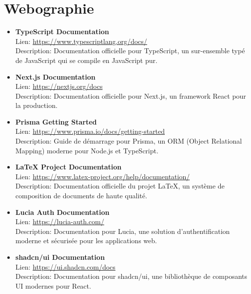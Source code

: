 \documentclass[12pt, french]{extreport}
\begin{document}
\printbibliography
\label{sec:bibliographie}

\chapter*{Webographie}
\label{sec:webographie}
\begin{itemize}
    \item \textbf{TypeScript Documentation} \\
    Lien: \url{https://www.typescriptlang.org/docs/} \\
    Description: Documentation officielle pour TypeScript, un sur-ensemble typé de JavaScript qui se compile en JavaScript pur.

    \item \textbf{Next.js Documentation} \\
    Lien: \url{https://nextjs.org/docs} \\
    Description: Documentation officielle pour Next.js, un framework React pour la production.

    \item \textbf{Prisma Getting Started} \\
    Lien: \url{https://www.prisma.io/docs/getting-started} \\
    Description: Guide de démarrage pour Prisma, un ORM (Object Relational Mapping) moderne pour Node.js et TypeScript.

    \item \textbf{LaTeX Project Documentation} \\
    Lien: \url{https://www.latex-project.org/help/documentation/} \\
    Description: Documentation officielle du projet LaTeX, un système de composition de documents de haute qualité.

    \item \textbf{Lucia Auth Documentation} \\
    Lien: \url{https://lucia-auth.com/} \\
    Description: Documentation pour Lucia, une solution d'authentification moderne et sécurisée pour les applications web.

    \item \textbf{shadcn/ui Documentation} \\
    Lien: \url{https://ui.shadcn.com/docs} \\
    Description: Documentation pour shadcn/ui, une bibliothèque de composants UI modernes pour React.


\end{itemize}
\end{document}
